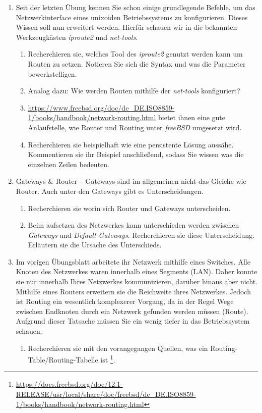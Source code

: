 \documentclass[paper=a4,fontsize=11pt]{scrartcl}%
\numberwithin{equation}{section}
\begin{document}
\begin{enumerate}
	\item Seit der letzten Übung kennen Sie schon einige grundlegende Befehle, um das Netzwerkinterface eines unixoiden Betriebssystems zu konfigurieren. Dieses Wissen soll nun erweitert werden. Hierfür schauen wir in die bekannten Werkzeugkästen \emph{iproute2} und \emph{net-tools}.
	\begin{enumerate}
	\item Recherchieren sie, welches Tool des \emph{iproute2} genutzt werden kann um Routen zu setzen. Notieren Sie sich die Syntax und was die Parameter bewerkstelligen.
	\item Analog dazu: Wie werden Routen mithilfe der \emph{net-tools} konfiguriert?
	\item \url{https://www.freebsd.org/doc/de_DE.ISO8859-1/books/handbook/network-routing.html} bietet ihnen eine gute Anlaufstelle, wie Router und Routing unter \emph{freeBSD} umgesetzt wird.
	\item Recherchieren sie beispielhaft wie eine persistente Lösung aussähe. Kommentieren sie ihr Beispiel anschließend, sodass Sie wissen was die einzelnen Zeilen bedeuten.
	\end{enumerate}
	\item Gateways \& Router -- Gateways sind im allgemeinen nicht das Gleiche wie Router. Auch unter den Gateways gibt es Unterscheidungen.
	\begin{enumerate}
	\item Recherchieren sie worin sich Router und Gateways unterscheiden.
	\item Beim aufsetzen des Netzwerkes kann unterschieden werden zwischen \emph{Gateways} und \emph{Default Gateways}. Recherchieren sie diese Unterscheidung. Erläutern sie die Ursache des Unterschieds.
	\end{enumerate}
	\item Im vorigen Übungsblatt arbeitete ihr Netzwerk mithilfe eines Switches. Alle Knoten des Netzwerkes waren innerhalb eines Segments (LAN). Daher konnte sie nur innerhalb Ihres Netzwerkes kommunizieren, darüber hinaus aber nicht. Mithilfe eines Routers erweitern sie die Reichweite ihres Netzwerkes. Jedoch ist Routing ein wesentlich komplexerer Vorgang, da in der Regel Wege zwischen Endknoten durch ein Netzwerk gefunden werden müssen (Route). Aufgrund dieser Tatsache müssen Sie ein wenig tiefer in das Betriebssystem schauen.
	\begin{enumerate}
	\item Recherchieren sie mit den vorangegangen Quellen, was ein Routing-Table/Routing-Tabelle ist \footnote{\url{https://docs.freebsd.org/doc/12.1-RELEASE/usr/local/share/doc/freebsd/de_DE.ISO8859-1/books/handbook/network-routing.html}}.

\end{enumerate}
\end{enumerate}
\end{document}
